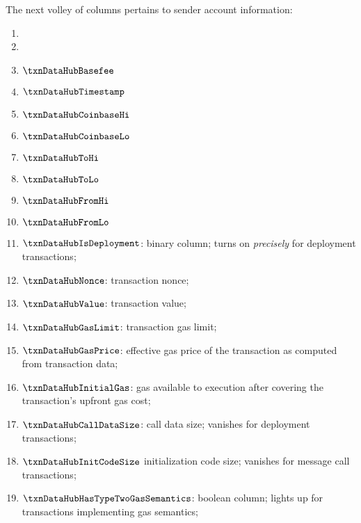 The next volley of columns pertains to sender account information:
\begin{enumerate}
	\item
		\markAsExtractedFromBtc{}
		\txnDataHubBlockNumber{}
	\item
		\markAsExtractedFromBtc{}
		\txnDataHubBlockGasLimit{}
	\item
		\markAsExtractedFromBtc{}
		$\txnDataHubBasefee$
	\item
		\markAsExtractedFromBtc{}
		$\txnDataHubTimestamp$
	\item
		\markAsExtractedFromBtc{}
		$\txnDataHubCoinbaseHi$
	\item
		\markAsExtractedFromBtc{}
		$\txnDataHubCoinbaseLo$
	\item
		\markAsExtractedFromRlpTxn{}
		\markAsExtractedFromRlpAddr{}
		$\txnDataHubToHi$
	\item
		\markAsExtractedFromRlpTxn{}
		\markAsExtractedFromRlpAddr{}
		$\txnDataHubToLo$
	\item
		\markAsExtractedFromEcrecover{}
		$\txnDataHubFromHi$
	\item
		\markAsExtractedFromEcrecover{}
		$\txnDataHubFromLo$
	\item
		\markAsExtractedFromRlpTxn{}
		$\txnDataHubIsDeployment$:
		binary column;
		turns on \emph{precisely} for deployment transactions;
	\item
		\markAsExtractedFromRlpTxn{}
		$\txnDataHubNonce$:
		transaction nonce;
	\item
		\markAsExtractedFromRlpTxn{}
		$\txnDataHubValue$:
		transaction value;
	\item
		\markAsExtractedFromRlpTxn{}
		$\txnDataHubGasLimit$:
		transaction gas limit;
	\item
		\markAsJustifiedHere{}
		$\txnDataHubGasPrice$:
		effective gas price of the transaction as computed from transaction data;
	\item
		\markAsJustifiedHere{}
		$\txnDataHubInitialGas$:
		gas available to \evm{} execution after covering the transaction's upfront gas cost;
	\item
		\markAsJustifiedHere{}
		$\txnDataHubCallDataSize$:
		call data size;
		vanishes for deployment transactions;
	\item
		\markAsJustifiedHere{}
		$\txnDataHubInitCodeSize$
		initialization code size;
		vanishes for message call transactions;
	\item
		\markAsJustifiedHere{}
		$\txnDataHubHasTypeTwoGasSemantics$:
		boolean column;
		lights up for transactions implementing \cite{EIP-1559} gas semantics;

\end{enumerate}
